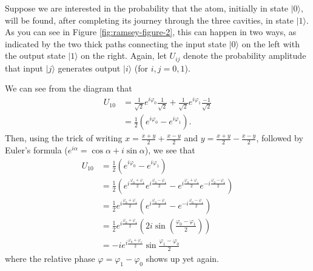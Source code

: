 \documentclass[fleqn]{article}
\begin{document}
Suppose we are interested in the probability that the atom, initially in state \(|0\rangle\), will be found, after completing its journey through the three cavities, in state \(|1\rangle\).
As you can see in Figure \ref{fig:ramsey-figure-2}, this can happen in two ways, as indicated by the two thick paths connecting the input state \(|0\rangle\) on the left with the output state \(|1\rangle\) on the right.
Again, let \(U_{ij}\) denote the probability amplitude that input \(|j\rangle\) generates output \(|i\rangle\) (for \(i,j=0,1\)).

We can see from the diagram that
\[
  \begin{aligned}
    U_{10}
    &= \frac{1}{\sqrt{2}} e^{i\varphi_0}\frac{1}{\sqrt{2}} + \frac{1}{\sqrt{2}} e^{i\varphi_1}\frac{-1}{\sqrt{2}}
  \\&= \frac{1}{2} \left(e^{i\varphi_0}-e^{i\varphi_1}\right).
  \end{aligned}
\]
Then, using the trick of writing \(x=\frac{x+y}{2}+\frac{x-y}{2}\) and \(y=\frac{x+y}{2}-\frac{x-y}{2}\), followed by Euler's formula (\(e^{i\alpha}=\cos\alpha+i\sin\alpha\)), we see that
\[
\begin{aligned}
U_{10}
&= \frac{1}{2} \left(e^{i\varphi_0}-e^{i\varphi_1}\right)
\\&= \frac{1}{2}\left( e^{i\frac{\varphi_0+\varphi_1}{2}}e^{i\frac{\varphi_0-\varphi_1}{2}} - e^{i\frac{\varphi_0+\varphi_1}{2}}e^{-i\frac{\varphi_0-\varphi_1}{2}}\right)
\\&= \frac{1}{2} e^{i\frac{\varphi_0+\varphi_1}{2}} \left( e^{i\frac{\varphi_0-\varphi_1}{2}} - e^{-i\frac{\varphi_0-\varphi_1}{2}}\right)
\\&= \frac{1}{2} e^{i\frac{\varphi_0+\varphi_1}{2}} \left( 2i \sin\left(\frac{\varphi_0 - \varphi_1}{2}\right) \right)
\\&= -ie^{i\frac{\varphi_0+\varphi_1}{2}}\sin\frac{\varphi_1-\varphi_0}{2}
\end{aligned}
\]
where the relative phase \(\varphi=\varphi_1-\varphi_0\) shows up yet again.
\end{document}
